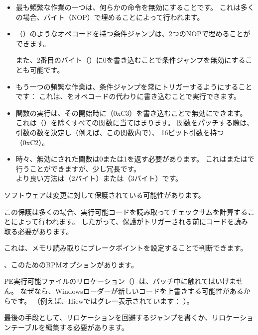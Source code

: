 \begin{itemize}

\item 
最も頻繁な作業の一つは、何らかの命令を無効にすることです。
これは多くの場合、バイト（\ac{NOP}）で埋めることによって行われます。

\item {}（\JZ）のようなオペコードを持つ条件ジャンプは、2つの\ac{NOP}で埋めることができます。

また、2番目のバイト（）に0を書き込むことで条件ジャンプを無効にすることも可能です。

\item 
もう一つの頻繁な作業は、条件ジャンプを常にトリガーするようにすることです：
これは、をオペコードの代わりに書き込むことで実行できます。

\item 関数の実行は、その開始時に\RETN（0xC3）を書き込むことで無効にできます。
これは（）を除くすべての関数に当てはまります。
関数をパッチする際は、引数の数を決定し（例えば、この関数内で）、
16ビット引数を持つ（0xC2）。

\item 時々、無効にされた関数は0または1を返す必要があります。
これはまたはで行うことができますが、少し冗長です。\\
より良い方法は（2バイト）または（3バイト）です。

\end{itemize}

ソフトウェアは変更に対して保護されている可能性があります。

この保護は多くの場合、実行可能コードを読み取ってチェックサムを計算することによって行われます。
したがって、保護がトリガーされる前にコードを読み取る必要があります。

これは、メモリ読み取りにブレークポイントを設定することで判断できます。

、このためのBPMオプションがあります。

PE実行可能ファイルのリロケーション（）は、パッチ中に触れてはいけません。
なぜなら、Windowsローダーが新しいコードを上書きする可能性があるからです。
（例えば、Hiewではグレー表示されています：
）。

最後の手段として、リロケーションを回避するジャンプを書くか、リロケーションテーブルを編集する必要があります。